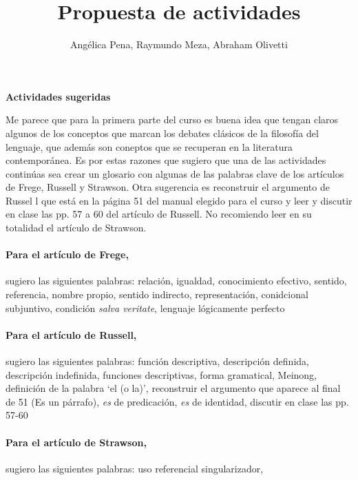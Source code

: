 \documentclass{tufte-handout}
\title{Propuesta de actividades}
\author{Angélica Pena,
        Raymundo Meza,
        Abraham Olivetti
       }
\date{}
\begin{document}
\maketitle


\textbf{Actividades sugeridas}

Me parece que para la primera parte del curso es buena idea que tengan claros algunos de los conceptos que marcan los debates clásicos de la filosofía del lenguaje, que además son coneptos que se recuperan en la literatura contemporánea. Es por estas razones que sugiero que una de las actividades continúas sea crear un glosario con algunas de las palabras clave de los artículos de Frege, Russell y Strawson. Otra sugerencia es reconstruir el argumento de Russel l que está en la página 51 del manual elegido para el curso y leer y discutir en clase las pp. 57 a 60 del artículo de Russell. No recomiendo leer en su totalidad el artículo de Strawson.

\paragraph{Para el artículo de Frege,} sugiero las siguientes palabras: relación, igualdad, conocimiento efectivo, sentido, referencia, nombre propio, sentido indirecto, representación, conidcional subjuntivo, condición \textit{salva veritate}, lenguaje lógicamente perfecto

\paragraph{Para el artículo de Russell,} sugiero las siguientes palabras: función descriptiva, descripción definida, descripción indefinida, funciones descriptivas, forma gramatical, Meinong, definición de la palabra `el (o la)', reconstruir el argumento que aparece al final de 51 (Es un párrafo), \textit{es} de predicación, \textit{es} de identidad, discutir en clase las pp. 57-60

\paragraph{Para el artículo de Strawson,} sugiero las siguientes palabras: uso referencial singularizador,
\end{document}
